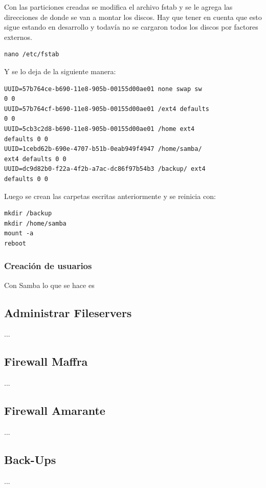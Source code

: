 \documentclass[12pt,a4paper]{article}
\begin{document}
Con las particiones creadas se modifica el archivo fstab y se le agrega las direcciones de donde se van a montar los discos. Hay que tener en cuenta que esto sigue estando en desarrollo y todavía no se cargaron todos los discos por factores externos.

\begin{lstlisting}
nano /etc/fstab
\end{lstlisting}

Y se lo deja de la siguiente manera:

\begin{lstlisting}
UUID=57b764ce-b690-11e8-905b-00155d00ae01 none swap sw 
0 0
UUID=57b764cf-b690-11e8-905b-00155d00ae01 /ext4 defaults 
0 0
UUID=5cb3c2d8-b690-11e8-905b-00155d00ae01 /home ext4 
defaults 0 0
UUID=1cebd62b-690e-4707-b51b-0eab949f4947 /home/samba/ 
ext4 defaults 0 0
UUID=dc9d82b0-f22a-4f2b-a7ac-dc86f97b54b3 /backup/ ext4 
defaults 0 0
\end{lstlisting}

Luego se crean las carpetas escritas anteriormente y se reinicia con:

\begin{lstlisting}
mkdir /backup
mkdir /home/samba
mount -a
reboot
\end{lstlisting}

\subsubsection{Creación de usuarios}
Con Samba lo que se hace es 



\subsection{Administrar Fileservers} %
...

\subsection{Firewall Maffra}
...

\subsection{Firewall Amarante} %
...

\subsection{Back-Ups} 
...
\end{document}
